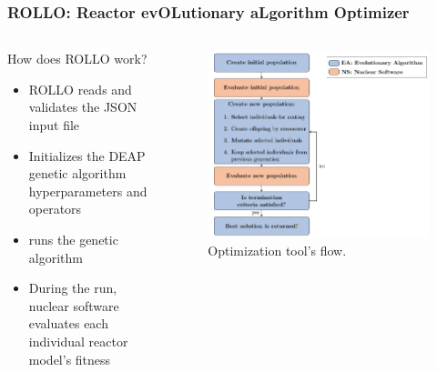 \begin{frame}
    \frametitle{ROLLO: Reactor evOLutionary aLgorithm Optimizer}
    \begin{columns}
        \begin{column}{0.5\textwidth}
            \begin{block}{How does ROLLO work?}
                \begin{itemize}
                    \item ROLLO reads and validates the JSON input file
                    \item Initializes the \acrfull{DEAP} genetic algorithm hyperparameters and 
                    operators 
                    \item runs the genetic algorithm  
                    \item During the run, nuclear software evaluates each individual reactor 
                    model's fitness
                \end{itemize}
                \end{block}
        \end{column}
        \begin{column}{0.5\textwidth} 
            \begin{figure}
                \includegraphics[width=\linewidth]{figures/rollo-flow.png} 
                \caption{Optimization tool's flow.}
            \end{figure}
        \end{column}
        \end{columns}

\end{frame}

